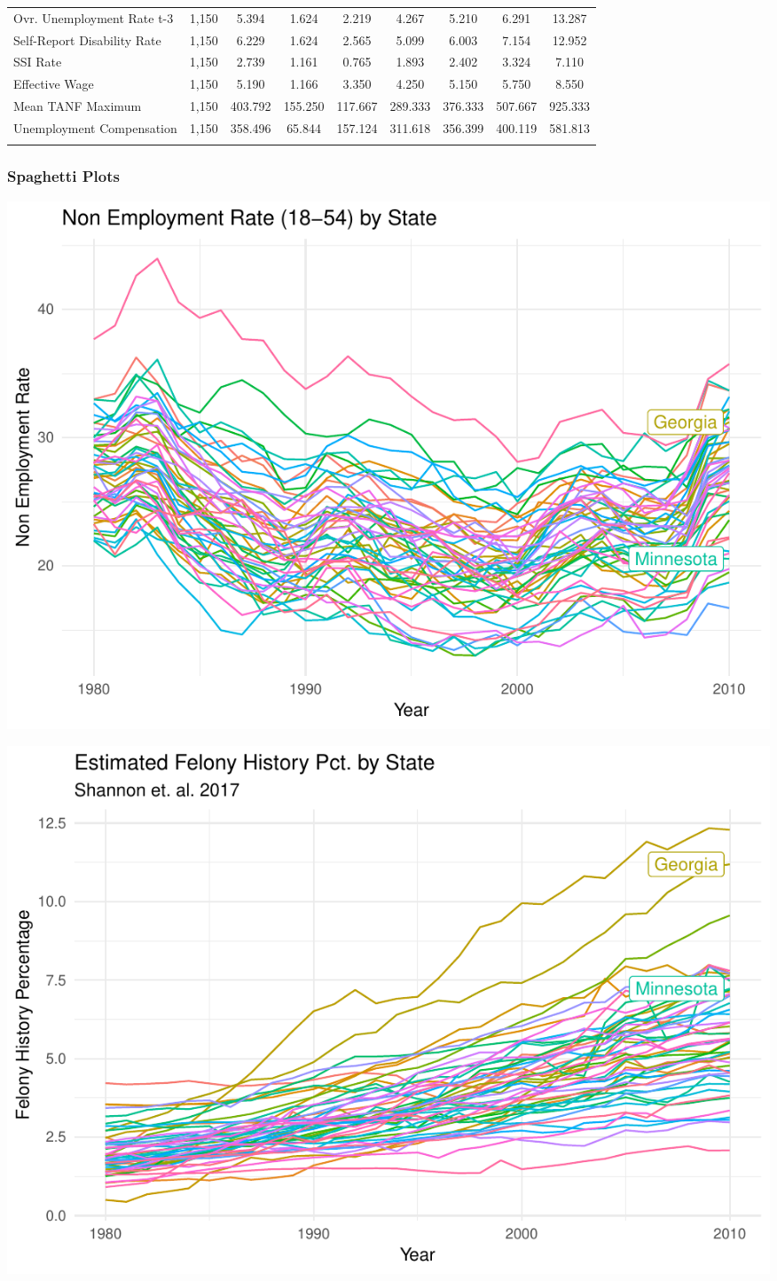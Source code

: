 \documentclass[11pt,]{article}
\begin{document}
\begin{table}[!htbp]
\begin{tabular}{@{\extracolsep{5pt}}lcccccccc}
Ovr. Unemployment Rate t-3 & 1,150 & 5.394 & 1.624 & 2.219 & 4.267 & 5.210 & 6.291 & 13.287 \\ 
Self-Report Disability Rate & 1,150 & 6.229 & 1.624 & 2.565 & 5.099 & 6.003 & 7.154 & 12.952 \\ 
SSI Rate & 1,150 & 2.739 & 1.161 & 0.765 & 1.893 & 2.402 & 3.324 & 7.110 \\ 
Effective Wage & 1,150 & 5.190 & 1.166 & 3.350 & 4.250 & 5.150 & 5.750 & 8.550 \\ 
Mean TANF Maximum & 1,150 & 403.792 & 155.250 & 117.667 & 289.333 & 376.333 & 507.667 & 925.333 \\ 
Unemployment Compensation & 1,150 & 358.496 & 65.844 & 157.124 & 311.618 & 356.399 & 400.119 & 581.813 \\ 
\hline \\[-1.8ex] 
\end{tabular} 
\end{table}

\subsubsection{Spaghetti Plots}\label{spaghetti-plots}

\includegraphics{P6_final_analyses_files/figure-latex/unnamed-chunk-3-1.pdf}

\includegraphics{P6_final_analyses_files/figure-latex/unnamed-chunk-4-1.pdf}
\end{document}
